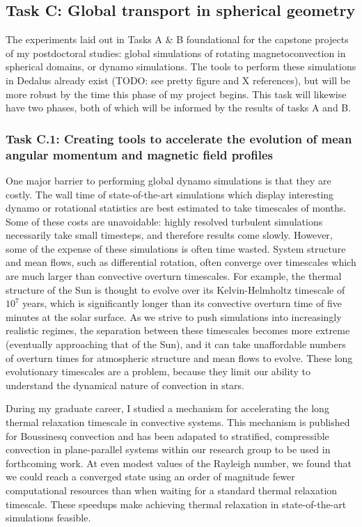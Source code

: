 \documentclass[aasms,12pt]{article}
\begin{document}
\subsection{Task C: Global transport in spherical geometry}
\label{sct:global_models}
The experiments laid out in Tasks A \& B foundational for the capstone projects of my postdoctoral studies: global simulations of rotating magnetoconvection in spherical domains, or dynamo simulations.
The tools to perform these simulations in Dedalus already exist (TODO: see pretty figure and X references), but will be more robust by the time this phase of my project begins.
This task will likewise have two phases, both of which will be informed by the results of tasks A and B.

\subsubsection{Task C.1: Creating tools to accelerate the evolution of mean angular momentum and magnetic field profiles}
One major barrier to performing global dynamo simulations is that they are costly.
The wall time of state-of-the-art simulations which display interesting dynamo or rotational statistics are best estimated to take timescales of months.
Some of these costs are unavoidable: highly resolved turbulent simulations necessarily take small timesteps, and therefore results come slowly.
However, some of the expense of these simulations is often time wasted.
System structure and mean flows, such as differential rotation, often converge over timescales which are much larger than convective overturn timescales.
For example, the thermal structure of the Sun is thought to evolve over its Kelvin-Helmholtz timescale of $10^7$ years, which is significantly longer than its convective overturn time of five minutes at the solar surface.
As we strive to push simulations into increasingly realistic regimes, the separation between these timescales becomes more extreme (eventually approaching that of the Sun), and it can take unaffordable numbers of overturn times for atmospheric structure and mean flows to evolve.
These long evolutionary timescales are a problem, because they limit our ability to understand the dynamical nature of convection in stars.

During my graduate career, I studied a mechanism for accelerating the long thermal relaxation timescale in convective systems.
This mechanism is published for Boussinesq convection \citep{anders&all2018} and has been adapated to stratified, compressible convection in plane-parallel systems within our research group to be used in forthcoming work.
At even modest values of the Rayleigh number, we found that we could reach a converged state using an order of magnitude fewer computational resources than when waiting for a standard thermal relaxation timescale.
These speedups make achieving thermal relaxation in state-of-the-art simulations feasible.
\end{document}
